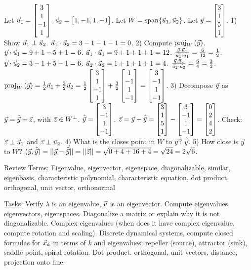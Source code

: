 \documentclass[10pt,a4paper]{article}
\begin{document}
\begin{example}
	Let $\vec{u}_1 = \begin{bmatrix}3\\1\\-1\\1\end{bmatrix},\vec{u}_2=\begin{bmatrix}1,-1,1,-1\end{bmatrix}$. Let $W = \text{span}\{\vec{u}_1,\vec{u}_2\}$. Let $\vec{y}=\begin{bmatrix}3\\1\\5\\1\end{bmatrix}$. 1) Show $\vec{u}_1 \perp \vec{u}_2$. $\vec{u}_1\cdot\vec{u}_2 = 3-1-1-1 = 0$. 2) Compute $\text{proj}_{W}\left(\vec{y}\right)$. $\vec{y}\cdot\vec{u}_1 = 9+1-5+1=6$. $\vec{u}_1\cdot\vec{u}_1 = 9+1+1+1 = 12$. $\frac{\vec{y}\cdot\vec{u}_1}{\vec{u}_1\cdot\vec{u}_1} = \frac{6}{12} = \frac{1}{2}$. $\vec{y}\cdot\vec{u}_2 = 3-1+5-1=6$. $\vec{u}_2\cdot\vec{u}_2 = 1+1+1+1=4$. $\frac{\vec{y}\cdot\vec{u}_2}{\vec{u}_2\cdot\vec{u}_2} = \frac{6}{4} = \frac{3}{2}$. $\text{proj}_{W}\left(\vec{y}\right) = \frac{1}{2}\vec{u}_1 + \frac{3}{2}\vec{u}_2 = \frac{1}{2}\begin{bmatrix}3\\1\\-1\\1\end{bmatrix} + \frac{3}{2}\begin{bmatrix}1\\-1\\1\\-1\end{bmatrix} = \begin{bmatrix}3\\-1\\1\\-1\end{bmatrix}$. 3) Decompose $\vec{y}$ as $\vec{y}=\hat{\vec{y}} + \vec{z}$, with $\vec{z}\in W^\perp$. $\hat{\vec{y}} = \begin{bmatrix}3\\-1\\1\\-1\end{bmatrix}$. $\vec{z}=\vec{y}-\hat{\vec{y}} = \begin{bmatrix}3\\1\\5\\1\end{bmatrix} - \begin{bmatrix}3\\-1\\1\\-1\end{bmatrix} = \begin{bmatrix}0\\2\\4\\2\end{bmatrix}$. Check: $\vec{z}\perp\vec{u}_1$ and $\vec{z}\perp\vec{u}_2$. 4) What is the closes point in $W$ to $\vec{y}$? $\hat{\vec{y}}$. 5) How close is $\vec{y}$ to $W$? $(\vec{y},\hat{\vec{y}}) = ||\vec{y}-\hat{\vec{y}}|| = ||\vec{z}|| = \sqrt{0+4+16+4} = \sqrt{24} = 2\sqrt{6}$.
\end{example}

\underline{Review Terms}:
Eigenvalue, eigenvector, eigenspace, diagonalizable, similar, eigenbasis, characteristic polynomial, characteristic equation, dot product, orthogonal, unit vector, orthonormal

\underline{Tasks}: Verify $\lambda$ is an eigenvalue, $\vec{v}$ is an eigenvector. 
Compute eigenvalues, eigenvectors, eigenspaces. 
Diagonalize a matrix or explain why it is not diagonalizable. 
Complex eigenvalues (when does it have complex eigenvalue, compute rotation and scaling).
Discrete dynamical systems, compute closed formulas for $\vec{x}_k$ in terms of $k$ and eigenvalues; repeller (source), attractor (sink), saddle point, spiral rotation.
Dot product. orthogonal, unit vectors, distance, projection onto line.
\end{document}
